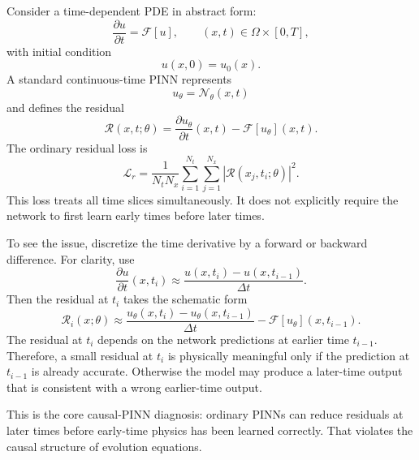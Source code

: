 \documentclass[11pt]{article}
\newcommand{\Om}{\Omega}
\begin{document}
Consider a time-dependent PDE in abstract form:
\begin{equation}
\frac{\partial u}{\partial t}=\mathcal{F}[u],\qquad (x,t)\in\Om\times[0,T],
\label{eq:abstract_evolution_pde}
\end{equation}
with initial condition
\begin{equation}
u(x,0)=u_0(x).
\end{equation}
A standard continuous-time PINN represents
\begin{equation}
u_{\theta}=\mathcal{N}_{\theta}(x,t)
\end{equation}
and defines the residual
\begin{equation}
\mathcal{R}(x,t;\theta)=\frac{\partial u_{\theta}}{\partial t}(x,t)-\mathcal{F}[u_{\theta}](x,t).
\label{eq:evolution_residual}
\end{equation}
The ordinary residual loss is
\begin{equation}
\mathcal{L}_r=\frac{1}{N_tN_x}\sum_{i=1}^{N_t}\sum_{j=1}^{N_x}
\left|\mathcal{R}(x_j,t_i;\theta)\right|^2.
\label{eq:ordinary_time_residual_sum}
\end{equation}
This loss treats all time slices simultaneously. It does not explicitly require the network to first learn early times before later times.

To see the issue, discretize the time derivative by a forward or backward difference. For clarity, use
\begin{equation}
\frac{\partial u}{\partial t}(x,t_i)\approx \frac{u(x,t_i)-u(x,t_{i-1})}{\Delta t}.
\label{eq:fd_time_derivative}
\end{equation}
Then the residual at $t_i$ takes the schematic form
\begin{equation}
\mathcal{R}_i(x;\theta)\approx
\frac{u_{\theta}(x,t_i)-u_{\theta}(x,t_{i-1})}{\Delta t}-\mathcal{F}[u_{\theta}](x,t_{i-1}).
\label{eq:discrete_residual_depends_on_previous}
\end{equation}
The residual at $t_i$ depends on the network predictions at earlier time $t_{i-1}$. Therefore, a small residual at $t_i$ is physically meaningful only if the prediction at $t_{i-1}$ is already accurate. Otherwise the model may produce a later-time output that is consistent with a wrong earlier-time output.

This is the core causal-PINN diagnosis: ordinary PINNs can reduce residuals at later times before early-time physics has been learned correctly. That violates the causal structure of evolution equations.
\end{document}
